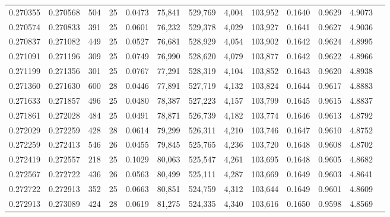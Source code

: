 \begin{tabular}{rrrrrrrrrrrrr}
0.270355 & 0.270568 &   504 &  25 &                                     0.0473 &  75,841 & 529,769 &   4,004 & 103,952 & 0.1640 & 0.9629 & 4.9073 \\
0.270574 & 0.270833 &   391 &  25 &                                     0.0601 &  76,232 & 529,378 &   4,029 & 103,927 & 0.1641 & 0.9627 & 4.9036 \\
0.270837 & 0.271082 &   449 &  25 &                                     0.0527 &  76,681 & 528,929 &   4,054 & 103,902 & 0.1642 & 0.9624 & 4.8995 \\
0.271091 & 0.271196 &   309 &  25 &                                     0.0749 &  76,990 & 528,620 &   4,079 & 103,877 & 0.1642 & 0.9622 & 4.8966 \\
0.271199 & 0.271356 &   301 &  25 &                                     0.0767 &  77,291 & 528,319 &   4,104 & 103,852 & 0.1643 & 0.9620 & 4.8938 \\
0.271360 & 0.271630 &   600 &  28 &                                     0.0446 &  77,891 & 527,719 &   4,132 & 103,824 & 0.1644 & 0.9617 & 4.8883 \\
0.271633 & 0.271857 &   496 &  25 &                                     0.0480 &  78,387 & 527,223 &   4,157 & 103,799 & 0.1645 & 0.9615 & 4.8837 \\
0.271861 & 0.272028 &   484 &  25 &                                     0.0491 &  78,871 & 526,739 &   4,182 & 103,774 & 0.1646 & 0.9613 & 4.8792 \\
0.272029 & 0.272259 &   428 &  28 &                                     0.0614 &  79,299 & 526,311 &   4,210 & 103,746 & 0.1647 & 0.9610 & 4.8752 \\
0.272259 & 0.272413 &   546 &  26 &                                     0.0455 &  79,845 & 525,765 &   4,236 & 103,720 & 0.1648 & 0.9608 & 4.8702 \\
0.272419 & 0.272557 &   218 &  25 &                                     0.1029 &  80,063 & 525,547 &   4,261 & 103,695 & 0.1648 & 0.9605 & 4.8682 \\
0.272567 & 0.272722 &   436 &  26 &                                     0.0563 &  80,499 & 525,111 &   4,287 & 103,669 & 0.1649 & 0.9603 & 4.8641 \\
0.272722 & 0.272913 &   352 &  25 &                                     0.0663 &  80,851 & 524,759 &   4,312 & 103,644 & 0.1649 & 0.9601 & 4.8609 \\
0.272913 & 0.273089 &   424 &  28 &                                     0.0619 &  81,275 & 524,335 &   4,340 & 103,616 & 0.1650 & 0.9598 & 4.8569 \\

\end{tabular}
